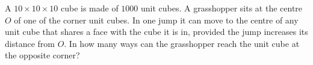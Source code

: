 A $10\times10\times10$ cube is made of $1000$ unit cubes. A grasshopper sits at the centre $O$ of one of the corner unit cubes. In one jump it can move to the centre of any unit cube that shares a face with the cube it is in, provided the jump increases its distance from $O$. In how many ways can the grasshopper reach the unit cube at the opposite corner?
